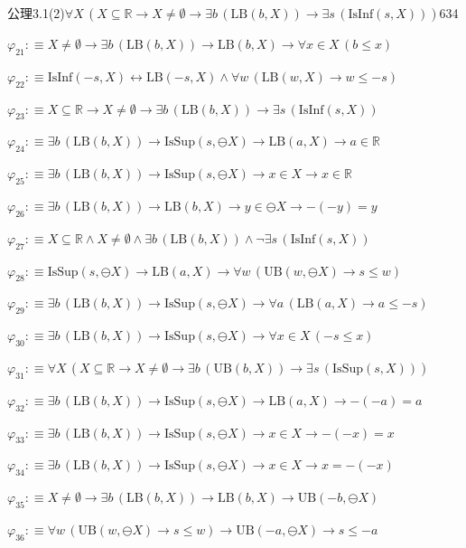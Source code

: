 \begin{fullproof}{公理3.1(2)}{$\forall X\,(X \subseteq \mathbb{R} \to X \neq \emptyset \to \exists b\,(\mathrm{LB}(b,X)) \to \exists s\,(\mathrm{IsInf}(s,X)))$}{634}
\begin{abbrevlist}
\item $\varphi_{21} :\equiv X \neq \emptyset \to \exists b\,(\mathrm{LB}(b,X)) \to \mathrm{LB}(b,X) \to \forall x \in X\,(b \leq x)$
\item $\varphi_{22} :\equiv \mathrm{IsInf}(-s,X) \leftrightarrow \mathrm{LB}(-s,X) \land \forall w\,(\mathrm{LB}(w,X) \to w \leq -s)$
\item $\varphi_{23} :\equiv X \subseteq \mathbb{R} \to X \neq \emptyset \to \exists b\,(\mathrm{LB}(b,X)) \to \exists s\,(\mathrm{IsInf}(s,X))$
\item $\varphi_{24} :\equiv \exists b\,(\mathrm{LB}(b,X)) \to \mathrm{IsSup}(s,\ominus X) \to \mathrm{LB}(a,X) \to a \in \mathbb{R}$
\item $\varphi_{25} :\equiv \exists b\,(\mathrm{LB}(b,X)) \to \mathrm{IsSup}(s,\ominus X) \to x \in X \to x \in \mathbb{R}$
\item $\varphi_{26} :\equiv \exists b\,(\mathrm{LB}(b,X)) \to \mathrm{LB}(b,X) \to y \in \ominus X \to -(-y) = y$
\item $\varphi_{27} :\equiv X \subseteq \mathbb{R} \land X \neq \emptyset \land \exists b\,(\mathrm{LB}(b,X)) \land \neg \exists s\,(\mathrm{IsInf}(s,X))$
\item $\varphi_{28} :\equiv \mathrm{IsSup}(s,\ominus X) \to \mathrm{LB}(a,X) \to \forall w\,(\mathrm{UB}(w,\ominus X) \to s \leq w)$
\item $\varphi_{29} :\equiv \exists b\,(\mathrm{LB}(b,X)) \to \mathrm{IsSup}(s,\ominus X) \to \forall a\,(\mathrm{LB}(a,X) \to a \leq -s)$
\item $\varphi_{30} :\equiv \exists b\,(\mathrm{LB}(b,X)) \to \mathrm{IsSup}(s,\ominus X) \to \forall x \in X\,(-s \leq x)$
\item $\varphi_{31} :\equiv \forall X\,(X \subseteq \mathbb{R} \to X \neq \emptyset \to \exists b\,(\mathrm{UB}(b,X)) \to \exists s\,(\mathrm{IsSup}(s,X)))$
\item $\varphi_{32} :\equiv \exists b\,(\mathrm{LB}(b,X)) \to \mathrm{IsSup}(s,\ominus X) \to \mathrm{LB}(a,X) \to -(-a) = a$
\item $\varphi_{33} :\equiv \exists b\,(\mathrm{LB}(b,X)) \to \mathrm{IsSup}(s,\ominus X) \to x \in X \to -(-x) = x$
\item $\varphi_{34} :\equiv \exists b\,(\mathrm{LB}(b,X)) \to \mathrm{IsSup}(s,\ominus X) \to x \in X \to x = -(-x)$
\item $\varphi_{35} :\equiv X \neq \emptyset \to \exists b\,(\mathrm{LB}(b,X)) \to \mathrm{LB}(b,X) \to \mathrm{UB}(-b,\ominus X)$
\item $\varphi_{36} :\equiv \forall w\,(\mathrm{UB}(w,\ominus X) \to s \leq w) \to \mathrm{UB}(-a,\ominus X) \to s \leq -a$

\end{abbrevlist}
\end{fullproof}
